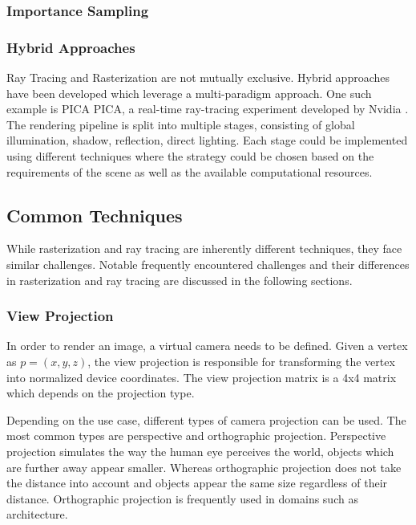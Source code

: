 \subsubsection{Importance Sampling}

\subsubsection{Hybrid Approaches}

Ray Tracing and Rasterization are not mutually exclusive. Hybrid approaches have been developed which leverage a multi-paradigm approach. One such example is PICA PICA, a real-time ray-tracing experiment developed by Nvidia \cite{hybridRenderingBarreBrisebois2019}. The rendering pipeline is split into multiple stages, consisting of global illumination, shadow, reflection, direct lighting. Each stage could be implemented using different techniques where the strategy could be chosen based on the requirements of the scene as well as the available computational resources.

\subsection{Common Techniques}

While rasterization and ray tracing are inherently different techniques, they face similar challenges. Notable frequently encountered challenges and their differences in rasterization and ray tracing are discussed in the following sections.

\subsubsection{View Projection}

In order to render an image, a virtual camera needs to be defined. Given a vertex as $p = (x, y, z)$, the view projection is responsible for transforming the vertex into normalized device coordinates. The view projection matrix is a 4x4 matrix which depends on the projection type.

Depending on the use case, different types of camera projection can be used. The most common types are perspective and orthographic projection. Perspective projection simulates the way the human eye perceives the world, objects which are further away appear smaller. Whereas orthographic projection does not take the distance into account and objects appear the same size regardless of their distance. Orthographic projection is frequently used in domains such as architecture.

